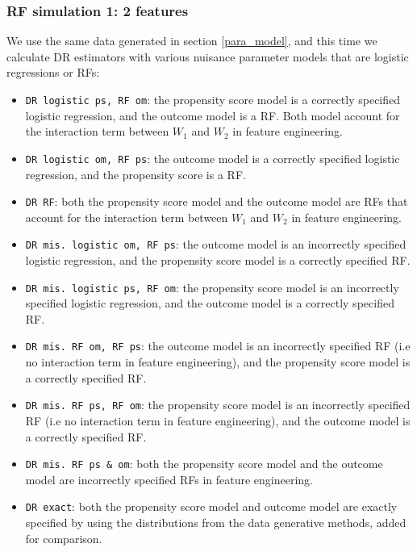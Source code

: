 \documentclass[12pt,twoside]{article}
\begin{document}

\subsubsection{RF simulation 1: 2 features}

We use the same data generated in section \ref{para_model}, and this time we calculate DR estimators with various nuisance parameter models that are logistic regressions or RFs:
\begin{itemize}
    \item \texttt{DR logistic ps, RF om}: the propensity score model is a correctly specified logistic regression, and the outcome model is a RF. Both model account for the interaction term between $W_1$ and $W_2$ in feature engineering.
    \item \texttt{DR logistic om, RF ps}: the outcome model is a correctly specified logistic regression, and the propensity score is a RF.
    \item \texttt{DR RF}: both the propensity score model and the outcome model are RFs that account for the interaction term between $W_1$ and $W_2$ in feature engineering.
    \item \texttt{DR mis. logistic om, RF ps}: the outcome model is an incorrectly specified logistic regression, and the propensity score model is a correctly specified RF.
    \item \texttt{DR mis. logistic ps, RF om}: the propensity score model is an incorrectly specified logistic regression, and the outcome model is a correctly specified RF.
    \item \texttt{DR mis. RF om, RF ps}: the outcome model is an incorrectly specified RF (i.e no interaction term in feature engineering), and the propensity score model is a correctly specified RF.
    \item \texttt{DR mis. RF ps, RF om}: the propensity score model is an incorrectly specified RF (i.e no interaction term in feature engineering), and the outcome model is a correctly specified RF.
    \item \texttt{DR mis. RF ps \& om}: both the propensity score model and the outcome model are incorrectly specified RFs in feature engineering.
    \item \texttt{DR exact}: both the propensity score model and outcome model are exactly specified by using the distributions from the data generative methods, added for comparison.
\end{itemize}
\end{document}
